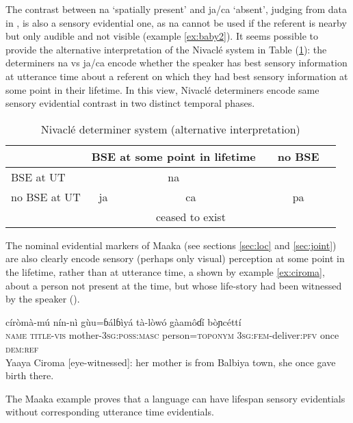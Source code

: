 \documentclass[oneside,a4paper,11pt]{article}
\newcommand{\ipa}[1]{{\phon \mbox{#1}}} %
\begin{document}
The contrast between \ipa{na} `spatially present' and \ipa{ja/ca} `absent', judging from data in \citet{gutierrez14determiners}, is also a sensory evidential one, as \ipa{na} cannot be used if the referent is nearby but only audible and not visible (example \ref{ex:baby2}). It seems possible to provide the alternative interpretation of the Nivaclé system in Table (\ref{tab:nivakle2}): the determiners \ipa{na} vs \ipa{ja/ca} encode whether the speaker has best sensory information at utterance time about a referent on which they had best sensory information at some point in their lifetime. In this view, Nivaclé determiners encode same sensory evidential contrast in two distinct temporal phases.
  
 
\begin{table}[H]
\caption{Nivaclé determiner system (alternative interpretation) } \centering \label{tab:nivakle2}
\begin{tabular}{l|c|cc|cc}
\toprule
&\multicolumn{2}{c}{BSE at some point in lifetime} && no BSE \\
\hline
BSE at UT& \multicolumn{2}{c}{\ipa{na}}&& \\
\cline{1-4}
no BSE at UT&\ipa{ja} & \ipa{ca}&&\ipa{pa}& \\
&&ceased to exist&\\
\bottomrule
\end{tabular}
\end{table}

The nominal evidential markers of Maaka (see sections \ref{sec:loc} and \ref{sec:joint}) are also clearly encode sensory (perhaps only visual) perception at some point in the lifetime, rather than at utterance time, a shown by example \ref{ex:ciroma}, about a person not present at the time, but whose life-story had been witnessed by the speaker (\citealt[196]{storch14maaka}).

\begin{exe}
\ex \label{ex:ciroma}
\gll \ipa{yáayà} \ipa{círòmà-mú} \ipa{nín-nì} \ipa{gùu=ɓálɓìyá} \ipa{tà-lòwó} \ipa{gàamôɗí} \ipa{bòɲcéttí} \\
\textsc{name} \textsc{title-vis} mother-\textsc{3sg:poss:masc} person=\textsc{toponym} \textsc{3sg:fem}-deliver:\textsc{pfv} once \textsc{dem:ref} \\
\glt Yaaya Ciroma [eye-witnessed]: her mother is from Balbiya town, she once gave birth there.
\end{exe}

 The Maaka example proves that a language can have lifespan sensory evidentials without corresponding utterance time evidentials.
  
\end{document}
